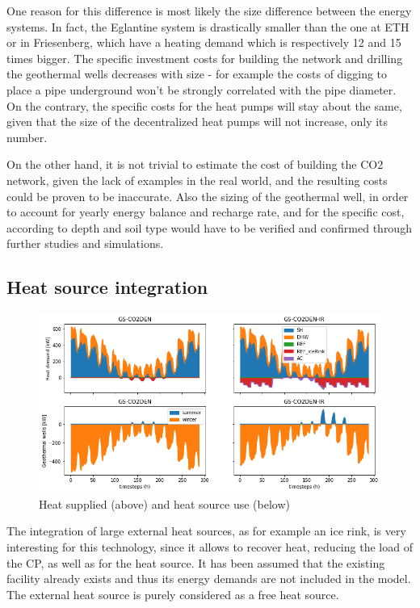 \documentclass{article}
\begin{document}
One reason for this difference is most likely the size difference between the energy systems. In fact, the Eglantine system is drastically smaller than the one at ETH or in Friesenberg, which have a heating demand which is respectively 12 and 15 times bigger. The specific investment costs for building the network and drilling the geothermal wells decreases with size - for example the costs of digging to place a pipe underground won't be strongly correlated with the pipe diameter. On the contrary, the specific costs for the heat pumps will stay about the same, given that the size of the decentralized heat pumps will not increase, only its number.

On the other hand, it is not trivial to estimate the cost of building the CO2 network, given the lack of examples in the real world, and the resulting costs could be proven to be inaccurate. Also the sizing of the geothermal well, in order to account for yearly energy balance and recharge rate, and for the specific cost, according to depth and soil type would have to be verified and confirmed through further studies and simulations.


\subsection{Heat source integration}

\begin{figure}[thpb]
	\centering
	\includegraphics[width=1\linewidth]{Images/V_IR_Q}
	\caption{Heat supplied (above) and heat source use (below)}
	\label{fig:V_IR_Q}
\end{figure}

The integration of large external heat sources, as for example an ice rink, is very interesting for this technology, since it allows to recover heat, reducing the load of the CP, as well as for the heat source. It has been assumed that the existing facility already exists and thus its energy demands are not included in the model. The external heat source is purely considered as a free heat source.\\
\end{document}
